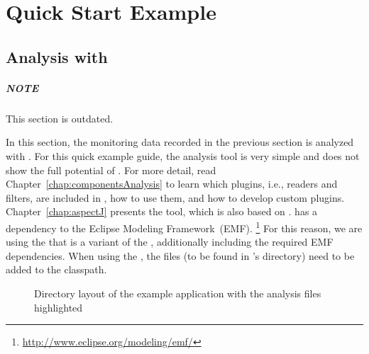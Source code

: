 %


\chapter{Quick Start Example}\label{chap:example}

\section{Analysis with \KiekerAnalysisPart{}}\label{sec:example:analysis}

\paragraph{NOTE} This section is outdated.

In this section, the monitoring data recorded in the previous section is %
analyzed with \KiekerAnalysisPart{}. %
For this quick example guide, the analysis tool is very simple and does not show %
the full potential of \Kieker{}. For more detail, read %
Chapter~\ref{chap:componentsAnalysis} to learn which plugins, i.e., readers %
and filters, are included in \Kieker{}, how to use them, and how to develop %
custom plugins. %
Chapter~\ref{chap:aspectJ} presents the \KiekerTraceAnalysis{} tool, which %
is also based on \KiekerAnalysisPart{}.
\KiekerAnalysisPart{} has a dependency to the Eclipse Modeling Framework~(EMF).%
\footnote{\url{http://www.eclipse.org/modeling/emf/}} %
For this reason, we are using the \file{\mainJarEMF{}} that is a variant of %
the \file{\mainJar{}}, additionally including the required EMF dependencies. %
When using the \file{\mainJar{}}, the  files (to %
be found in \Kieker's  directory) need to be added to the classpath. %

\begin{figure}[H]
\begin{graybox}
\end{graybox}
\caption{Directory layout of the example application with the analysis files highlighted}
\label{lst:analysisExampleLayout}
\end{figure}

